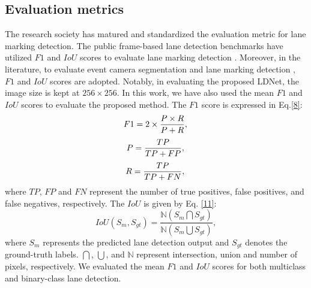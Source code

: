 \documentclass[journal]{IEEEtran}
\begin{document}
\subsection{Evaluation metrics}
\label{marker}
The research society has matured and standardized the evaluation metric for lane marking detection. The public frame-based lane detection benchmarks have utilized $F1$ and $IoU$ scores to evaluate lane marking detection \cite{2} \cite{3}. Moreover, in the literature, to evaluate event camera segmentation \cite{EVnet} and lane marking detection \cite{Cheng2019}, $F1$ and $IoU$ scores are adopted. Notably, in evaluating the proposed LDNet, the image size is kept at $256 \times 256$. In this work, we have also used the mean $F1$ and $IoU$ scores to evaluate the proposed method. The $F1$ score is expressed in Eq.\ref{8}: \\
\begin{equation}
F1=2 \times\frac{P\times R}{P + R},\\
\label{8}
\end{equation}
\begin{equation}
P=\frac{TP}{TP+FP},\\
\label{9}
\end{equation}
\begin{equation}
R=\frac{TP}{TP+FN},\\
\label{10}
\end{equation}
where $TP$, $FP$ and $FN$ represent the number of true positives, false positives, and false negatives, respectively. The $IoU$ is given by Eq. \ref{11}: \\
\begin{equation}
IoU(S_m,S_{gt})=\frac{\mathbb{N}(S_m\bigcap S_{gt})}{\mathbb{N}(S_m\bigcup S_{gt})},
\label{11}
\end{equation}
where $S_m$ represents the predicted lane detection output and $S_{gt}$ denotes the ground-truth labels. $\bigcap$, $\bigcup$, and $\mathbb{N}$ represent
intersection, union and number of pixels, respectively. We evaluated the mean $F1$ and $IoU$ scores for both multiclass and binary-class lane detection.
\end{document}
